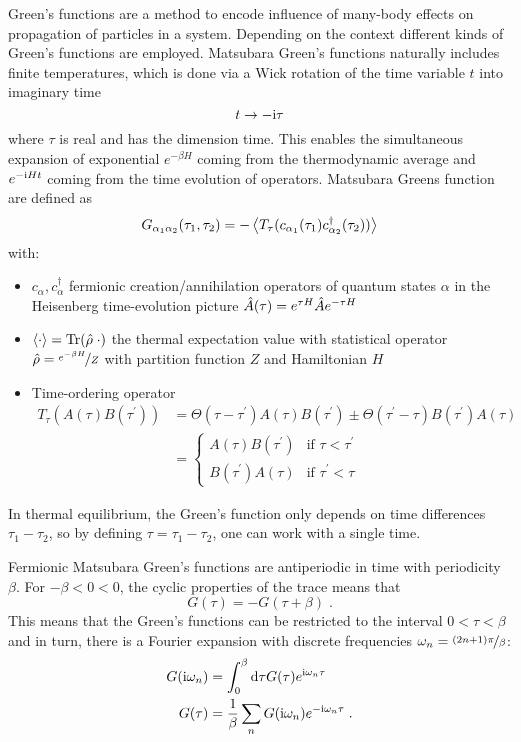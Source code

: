 \documentclass[../main.tex]{subfiles}
\begin{document}
Green's functions are a method to encode influence of many-body effects on propagation of particles in a system.
Depending on the context different kinds of Green's functions are employed.
Matsubara Green's functions naturally includes finite temperatures, which is done via a Wick rotation of the time variable \(t\) into imaginary time
\begin{equation}
	t \to -\mathrm{i} \tau
\end{equation}
where \(\tau\) is real and has the dimension time.
This enables the simultaneous expansion of exponential \(e^{-\beta H}\) coming from the thermodynamic average and \(e^{-\mathrm{i} H t}\) coming from the time evolution of operators.
Matsubara Greens function are defined as
\begin{equation}
	G_{\alpha_1 \alpha_2} (\tau_1, \tau_2) = - \Braket{T_{\tau} (c_{\alpha_1}(\tau_1) c^{\dagger}_{\alpha_2} (\tau_2))}
\end{equation}
with:
\begin{itemize}
	\item \(c_{\alpha}, c^{\dagger}_{\alpha}\) fermionic creation/annihilation operators of quantum states \(\alpha\) in the Heisenberg time-evolution picture \(\hat{A} (\tau) = e^{\tau H} \hat{A} e^{-\tau H}\)
	\item \(\braket{\cdot} = \operatorname{Tr}(\hat{\rho}\; \cdot)\) the thermal expectation value with statistical operator \(\hat{\rho} = \nicefrac{e^{-\beta H}}{Z}\) with partition function \(Z\) and Hamiltonian \(H\)
	\item Time-ordering operator
	\begin{align}
		T_{\tau} (A(\tau) B(\tau^{\prime})) &= \Theta(\tau - \tau^{\prime}) A(\tau) B(\tau^{\prime}) \pm \Theta(\tau^{\prime} - \tau) B(\tau^{\prime}) A(\tau) \nonumber \\
		&= \begin{cases}
			A (\tau) B(\tau^{\prime}) & \text{if } \tau < \tau^{\prime} \\
			B(\tau^{\prime}) A (\tau) & \text{if } \tau^{\prime} < \tau
		\end{cases}
	\end{align}
\end{itemize}
In thermal equilibrium, the Green's function only depends on time differences \(\tau_1 - \tau_2\), so by defining \(\tau = \tau_1 - \tau_2\), one can work with a single time.

Fermionic Matsubara Green's functions are antiperiodic in time with periodicity \(\beta\).
For \(-\beta < 0 < 0\), the cyclic properties of the trace means that
\begin{equation}
	G (\tau) = - G (\tau + \beta) \;.
\end{equation}
This means that the Green's functions can be restricted to the interval \(0 < \tau < \beta\) and in turn, there is a Fourier expansion with discrete frequencies \(\omega_n = \nicefrac{(2n + 1)\pi}{\beta}\):
\begin{align}
	G (\iu \omega_n) &= \int_{0}^{\beta} \odif{\tau} G (\tau) e^{\iu \omega_n \tau} \\
	G (\tau) &= \frac{1}{\beta} \sum_{n} G(\iu \omega_n) e^{-\iu \omega_n \tau} \;.
\end{align}
\end{document}
